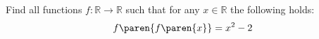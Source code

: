 Find all functions $f: \mathbb{R} \to \mathbb{R}$
such that for any $x \in \mathbb{R}$ the following holds:
\begin{equation*}
  f\paren{f\paren{x}} = x^2 - 2
\end{equation*}
